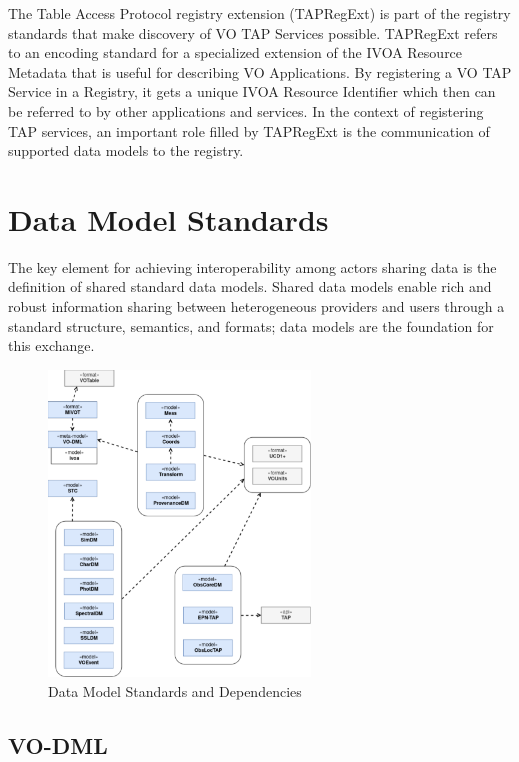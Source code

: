 \documentclass[11pt,letter]{ivoa}
\begin{document}
The Table Access Protocol registry extension (TAPRegExt) \citep{2012ivoa.spec.0827D} is part of the registry standards that make discovery of VO TAP Services possible.  
TAPRegExt refers to an encoding standard for a specialized extension of the IVOA Resource Metadata 
that is useful for describing VO Applications.  By registering a VO TAP Service in a Registry, it 
gets a unique IVOA Resource Identifier which then can be referred to by other applications and 
services.  In the context of registering TAP services, an important role filled by TAPRegExt is 
the communication of supported data models to the registry.

\section{Data Model Standards}

The key element for achieving interoperability among actors sharing data is the definition 
of shared standard data models. Shared data models enable rich and robust information sharing 
between heterogeneous providers and users through a standard structure, semantics, and formats; 
data models are the foundation for this exchange.

\begin{figure}[ht]
\centering
\includegraphics[width=0.62\textwidth]{ivoa-arch-dm.pdf}
\caption{Data Model Standards and Dependencies}
\label{fig:dmdeps}
\end{figure}

\subsection{VO-DML}
\end{document}
